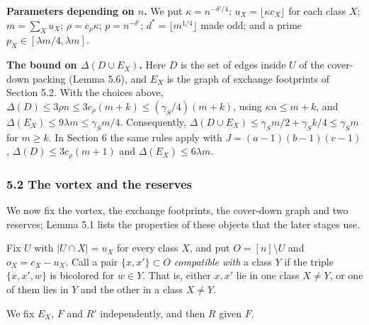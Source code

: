 \documentclass[english,11pt,a4paper]{article}
\begin{document}
\textbf{Parameters depending on \(n\).} We put \(\kappa=n^{-\delta'/4}\); \(u_X=\lfloor\kappa c_X\rfloor\) for each class \(X\); \(m=\sum_Xu_X\); \(\rho=c_\rho\kappa\); \(p=n^{-\delta'}\); \(d^*=\lfloor m^{1/4}\rfloor\) made odd; and a prime \(p_X\in[\lambda m/4,\lambda m]\).

\textbf{The bound on \(\Delta(D\cup E_X)\).} Here \(D\) is the set of edges inside \(U\) of the cover-down packing (Lemma 5.6), and \(E_X\) is the graph of exchange footprints of Section 5.2. With the choices above, \(\Delta(D)\le3\rho n\le3c_\rho(m+k)\le(\gamma_S/4)(m+k)\), using \(\kappa n\le m+k\), and \(\Delta(E_X)\le9\lambda m\le\gamma_S m/4\). Consequently, \(\Delta(D\cup E_X)\le\gamma_S m/2+\gamma_S k/4\le\gamma_S m\) for \(m\ge k\). In Section 6 the same rules apply with \(J=(a-1)(b-1)(c-1)\), \(\Delta(D)\le3c_\rho(m+1)\) and \(\Delta(E_X)\le6\lambda m\).

\subsubsection{5.2 The vortex and the reserves}\label{the-vortex-and-the-reserves}

We now fix the vortex, the exchange footprints, the cover-down graph and two reserves; Lemma 5.1 lists the properties of these objects that the later stages use.

Fix \(U\) with \(|U\cap X|=u_X\) for every class \(X\), and put \(O=[n]\setminus U\) and \(o_X=c_X-u_X\). Call a pair \(\{x,x'\}\subset O\) \emph{compatible with} a class \(Y\) if the triple \(\{x,x',w\}\) is bicolored for \(w\in Y\). That is, either \(x,x'\) lie in one class \(X\ne Y\), or one of them lies in \(Y\) and the other in a class \(X\ne Y\).

We fix \(E_X\), \(F\) and \(R'\) independently, and then \(R\) given \(F\).
\end{document}
